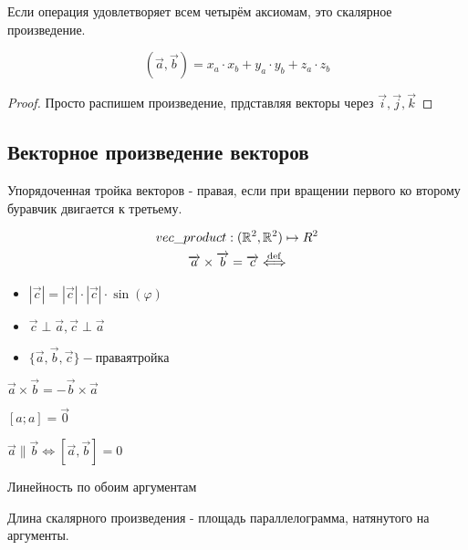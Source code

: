 \documentclass[12pt, a4paper]{article}
\begin{document}
    Если операция удовлетворяет всем четырём аксиомам, это скалярное произведение.

    \begin{theorem}
        \begin{equation}
            (\vec{a}, \vec{b}) = x_a \cdot x_b + y_a \cdot y_b + z_a \cdot z_b            
        \end{equation}
    \end{theorem}
    \begin{proof}
        Просто распишем произведение, прдставляя векторы через $\vec{i}, \vec{j}, \vec{k}$
    \end{proof}

    \subsection{Векторное произведение векторов}
    \begin{definition}
        Упорядоченная тройка векторов - правая, если при вращении первого ко второму буравчик двигается к третьему.
    \end{definition}
    
    \begin{definition}
        \begin{gather}
            vec\_product: ({\mathbb{R}}^2, {\mathbb{R}}^2) \mapsto R^2 \\
            \overrightarrow{a} \times \overrightarrow{b} = \overrightarrow{c} \overset{\mathrm{def}}{\Longleftrightarrow}
        \end{gather}
        \begin{itemize}
            \item $|\vec{c}| = |\vec{c}| \cdot |\vec{c}| \cdot \sin(\varphi)$
            \item $\vec{c} \perp \vec{a}, \vec{c} \perp \vec{a}$
            \item $\{ \vec{a}, \vec{b}, \vec{c} \} - правая тройка$
        \end{itemize}
    \end{definition}

    \begin{property}
        \item $\vec{a} \times \vec{b} = -\vec{b} \times \vec{a}$
        \item $[a; a] = \vec{0}$
        \item $\vec{a} \parallel \vec{b} \Leftrightarrow [\vec{a}, \vec{b}] = 0$
        \item Линейность по обоим аргументам
        \item Длина скалярного произведения - площадь параллелограмма, натянутого на аргументы.
    \end{property}
\end{document}
